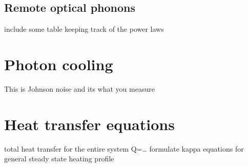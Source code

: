 \subsection{Remote optical phonons}
include some table keeping track of the power laws

\section{Photon cooling}
This is Johnson noise and its what you measure

\section{Heat transfer equations}
total heat transfer for the entire system Q=…
formulate kappa equations for general steady state heating profile
